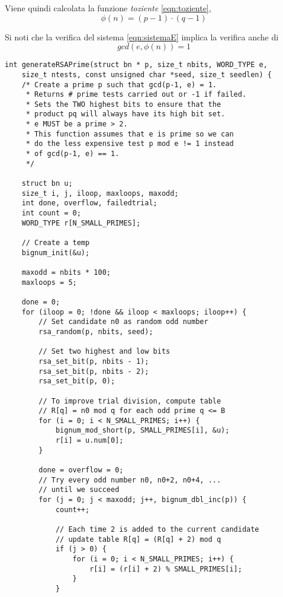 Viene quindi calcolata la funzione \emph{toziente} \eqref{eqn:toziente}, \[ \phi(n) = (p-1) \cdot (q-1) \]

Si noti che la verifica del sistema \eqref{eqn:sistemaE} implica la verifica anche di \[ gcd(e, \phi(n) ) = 1 \]

\begin{lstlisting}[basicstyle=\ttfamily\small, backgroundcolor=\color{bgCode}]
int generateRSAPrime(struct bn * p, size_t nbits, WORD_TYPE e,
    size_t ntests, const unsigned char *seed, size_t seedlen) {
    /* Create a prime p such that gcd(p-1, e) = 1.
     * Returns # prime tests carried out or -1 if failed.
     * Sets the TWO highest bits to ensure that the 
     * product pq will always have its high bit set.
     * e MUST be a prime > 2.
     * This function assumes that e is prime so we can
     * do the less expensive test p mod e != 1 instead
     * of gcd(p-1, e) == 1.
     */
    
    struct bn u;
    size_t i, j, iloop, maxloops, maxodd;
    int done, overflow, failedtrial;
    int count = 0;
    WORD_TYPE r[N_SMALL_PRIMES];
    
    // Create a temp
    bignum_init(&u);
    
    maxodd = nbits * 100;
    maxloops = 5;
    
    done = 0;
    for (iloop = 0; !done && iloop < maxloops; iloop++) {
        // Set candidate n0 as random odd number
        rsa_random(p, nbits, seed);
        
        // Set two highest and low bits
        rsa_set_bit(p, nbits - 1);
        rsa_set_bit(p, nbits - 2);
        rsa_set_bit(p, 0);
        
        // To improve trial division, compute table
        // R[q] = n0 mod q for each odd prime q <= B
        for (i = 0; i < N_SMALL_PRIMES; i++) {
            bignum_mod_short(p, SMALL_PRIMES[i], &u);
            r[i] = u.num[0];
        }
        
        done = overflow = 0;
        // Try every odd number n0, n0+2, n0+4, ...
        // until we succeed
        for (j = 0; j < maxodd; j++, bignum_dbl_inc(p)) {
            count++;
            
            // Each time 2 is added to the current candidate
            // update table R[q] = (R[q] + 2) mod q
            if (j > 0) {
                for (i = 0; i < N_SMALL_PRIMES; i++) {
                    r[i] = (r[i] + 2) % SMALL_PRIMES[i];
                }
            }
            

\end{lstlisting}
